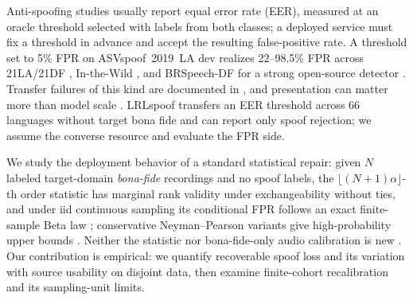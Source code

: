 \documentclass{article}
\begin{document}
Anti-spoofing studies usually report equal error rate (EER), measured at an oracle threshold selected with labels from both classes; a deployed service must fix a threshold in advance and accept the resulting false-positive rate.  A threshold set to 5\% FPR on ASVspoof~2019~LA dev \cite{asvspoof19} realizes 22--98.5\% FPR across 21LA/21DF \cite{asvspoof21}, In-the-Wild \cite{itw}, and BRSpeech-DF \cite{brspeechdf} for a strong open-source detector \cite{tak22}. Transfer failures of this kind are documented in \cite{eerhides26,kwok25}, and presentation can matter more than model scale \cite{delgado26}. LRLspoof \cite{lrlspoof26} transfers an EER threshold across 66 languages without target bona fide and can report only spoof rejection; we assume the converse resource and evaluate the FPR side.

We study the deployment behavior of a standard statistical repair: given $N$ labeled target-domain \emph{bona-fide} recordings and no spoof labels, the $\lfloor(N{+}1)\alpha\rfloor$-th order statistic has marginal rank validity under exchangeability without ties, and under iid continuous sampling its conditional FPR follows an exact finite-sample Beta law \cite{tong18,vovk}; conservative Neyman--Pearson variants give high-probability upper bounds \cite{tong18}. Neither the statistic nor bona-fide-only audio calibration is new \cite{zhao26ca}. Our contribution is empirical: we quantify recoverable spoof loss and its variation with source usability on disjoint data, then examine finite-cohort recalibration and its sampling-unit limits.
\end{document}
